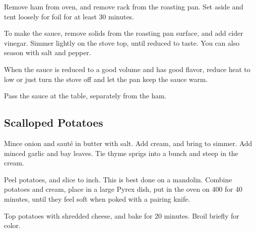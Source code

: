 \begin{recipe}
Remove ham from oven, and remove rack from the roasting pan. Set aside and tent loosely for foil for at least 30 minutes.

To make the sauce, remove solids from the roasting pan surface, and add cider vinegar. Simmer lightly on the stove top, until reduced to taste. You can also season with salt and pepper.

When the sauce is reduced to a good volume and has good flavor, reduce heat to low or just turn the stove off and let the pan keep the sauce warm.

Pass the sauce at the table, separately from the ham.

\subsection{Scalloped Potatoes}



Mince onion and sauté in butter with salt. Add cream, and bring to simmer. Add minced garlic and bay leaves. Tie thyme sprigs into a bunch and steep in the cream.


Peel potatoes, and slice to  inch. This is best done on a mandolin. Combine potatoes and cream, place in a large Pyrex dish, put in the oven on 400 for 40 minutes, until they feel soft when poked with a pairing knife.



Top potatoes with shredded cheese, and bake for 20 minutes. Broil briefly for color.

\end{recipe}

